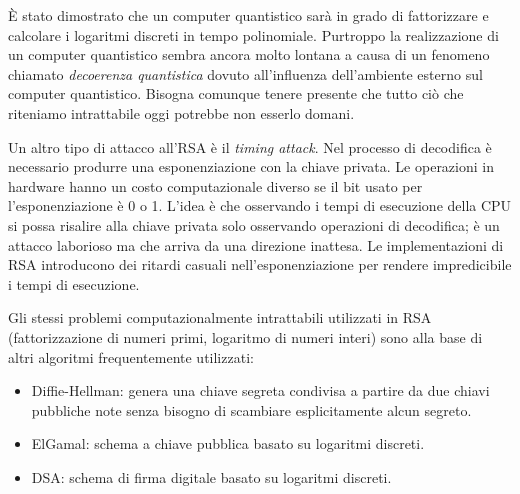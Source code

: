 È stato dimostrato che un computer quantistico sarà in grado di fattorizzare e calcolare i logaritmi discreti in tempo polinomiale. Purtroppo la realizzazione di un computer quantistico sembra ancora molto lontana a causa di un fenomeno chiamato \textit{decoerenza quantistica} dovuto all'influenza dell'ambiente esterno sul computer quantistico. Bisogna comunque tenere presente che tutto ciò che riteniamo intrattabile oggi potrebbe non esserlo domani.

Un altro tipo di attacco all'RSA è il \textit{timing attack}. Nel processo di decodifica è necessario produrre una esponenziazione con la chiave privata. Le operazioni in hardware hanno un costo computazionale diverso se il bit usato per l'esponenziazione è 0 o 1. L'idea è che osservando i tempi di esecuzione della CPU si possa risalire alla chiave privata solo osservando operazioni di decodifica; è un attacco laborioso ma che arriva da una direzione inattesa. Le implementazioni di RSA introducono dei ritardi casuali nell'esponenziazione per rendere impredicibile i tempi di esecuzione.

Gli stessi problemi computazionalmente intrattabili utilizzati in RSA (fattorizzazione di numeri primi, logaritmo di numeri interi) sono alla base di altri algoritmi frequentemente utilizzati:
\begin{itemize}
	\item Diffie-Hellman: genera una chiave segreta condivisa a partire da due chiavi pubbliche note senza bisogno di scambiare esplicitamente alcun segreto.
	\item ElGamal: schema a chiave pubblica basato su logaritmi discreti.
	\item DSA: schema di firma digitale basato su logaritmi discreti.
\end{itemize}

